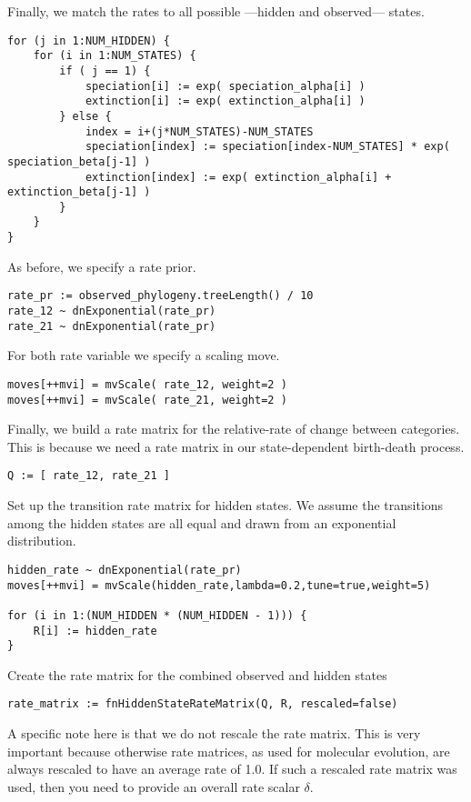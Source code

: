 Finally, we match the rates to all possible ---hidden and observed--- states.
{\tt \begin{snugshade*}
\begin{lstlisting}
for (j in 1:NUM_HIDDEN) {
    for (i in 1:NUM_STATES) {
        if ( j == 1) {
            speciation[i] := exp( speciation_alpha[i] )
            extinction[i] := exp( extinction_alpha[i] )
        } else {
            index = i+(j*NUM_STATES)-NUM_STATES
            speciation[index] := speciation[index-NUM_STATES] * exp( speciation_beta[j-1] )
            extinction[index] := exp( extinction_alpha[i] + extinction_beta[j-1] )
        }
    }
}
\end{lstlisting}
\end{snugshade*}}
As before, we specify a rate prior.
{\tt \begin{snugshade*}
\begin{lstlisting}
rate_pr := observed_phylogeny.treeLength() / 10
rate_12 ~ dnExponential(rate_pr)
rate_21 ~ dnExponential(rate_pr)
\end{lstlisting}
\end{snugshade*}}
For both rate variable we specify a scaling move.
{\tt \begin{snugshade*}
\begin{lstlisting}
moves[++mvi] = mvScale( rate_12, weight=2 )
moves[++mvi] = mvScale( rate_21, weight=2 )
\end{lstlisting}
\end{snugshade*}}
Finally, we build a rate matrix for the relative-rate of change between categories.
This is because we need a rate matrix in our state-dependent birth-death process.
{\tt \begin{snugshade*}
\begin{lstlisting}
Q := [ rate_12, rate_21 ]
\end{lstlisting}
\end{snugshade*}}
Set up the transition rate matrix for hidden states.
We assume the transitions among the hidden states are all equal and drawn from an exponential distribution.
{\tt \begin{snugshade*}
\begin{lstlisting}
hidden_rate ~ dnExponential(rate_pr)
moves[++mvi] = mvScale(hidden_rate,lambda=0.2,tune=true,weight=5)

for (i in 1:(NUM_HIDDEN * (NUM_HIDDEN - 1))) {
    R[i] := hidden_rate
}
\end{lstlisting}
\end{snugshade*}}
Create the rate matrix for the combined observed and hidden states
{\tt \begin{snugshade*}
\begin{lstlisting}
rate_matrix := fnHiddenStateRateMatrix(Q, R, rescaled=false)
\end{lstlisting}
\end{snugshade*}}
A specific note here is that we do not rescale the rate matrix. 
This is very important because otherwise rate matrices, as used for molecular evolution, are always rescaled to have an average rate of 1.0.
If such a rescaled rate matrix was used, then you need to provide an overall rate scalar $\delta$.

